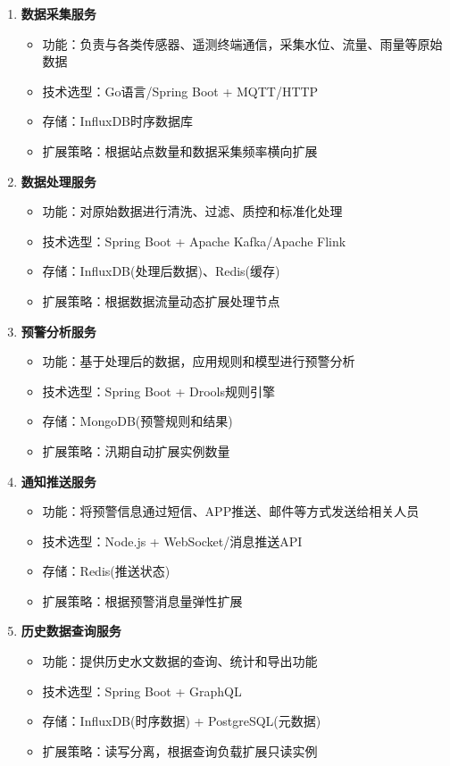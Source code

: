 \begin{enumerate}
\def\labelenumi{\arabic{enumi}.}
\tightlist
\item
  \textbf{数据采集服务}

  \begin{itemize}
  \tightlist
  \item
    功能：负责与各类传感器、遥测终端通信，采集水位、流量、雨量等原始数据
  \item
    技术选型：Go语言/Spring Boot + MQTT/HTTP
  \item
    存储：InfluxDB时序数据库
  \item
    扩展策略：根据站点数量和数据采集频率横向扩展
  \end{itemize}
\item
  \textbf{数据处理服务}

  \begin{itemize}
  \tightlist
  \item
    功能：对原始数据进行清洗、过滤、质控和标准化处理
  \item
    技术选型：Spring Boot + Apache Kafka/Apache Flink
  \item
    存储：InfluxDB(处理后数据)、Redis(缓存)
  \item
    扩展策略：根据数据流量动态扩展处理节点
  \end{itemize}
\item
  \textbf{预警分析服务}

  \begin{itemize}
  \tightlist
  \item
    功能：基于处理后的数据，应用规则和模型进行预警分析
  \item
    技术选型：Spring Boot + Drools规则引擎
  \item
    存储：MongoDB(预警规则和结果)
  \item
    扩展策略：汛期自动扩展实例数量
  \end{itemize}
\item
  \textbf{通知推送服务}

  \begin{itemize}
  \tightlist
  \item
    功能：将预警信息通过短信、APP推送、邮件等方式发送给相关人员
  \item
    技术选型：Node.js + WebSocket/消息推送API
  \item
    存储：Redis(推送状态)
  \item
    扩展策略：根据预警消息量弹性扩展
  \end{itemize}
\item
  \textbf{历史数据查询服务}

  \begin{itemize}
  \tightlist
  \item
    功能：提供历史水文数据的查询、统计和导出功能
  \item
    技术选型：Spring Boot + GraphQL
  \item
    存储：InfluxDB(时序数据) + PostgreSQL(元数据)
  \item
    扩展策略：读写分离，根据查询负载扩展只读实例
  \end{itemize}
\end{enumerate}

